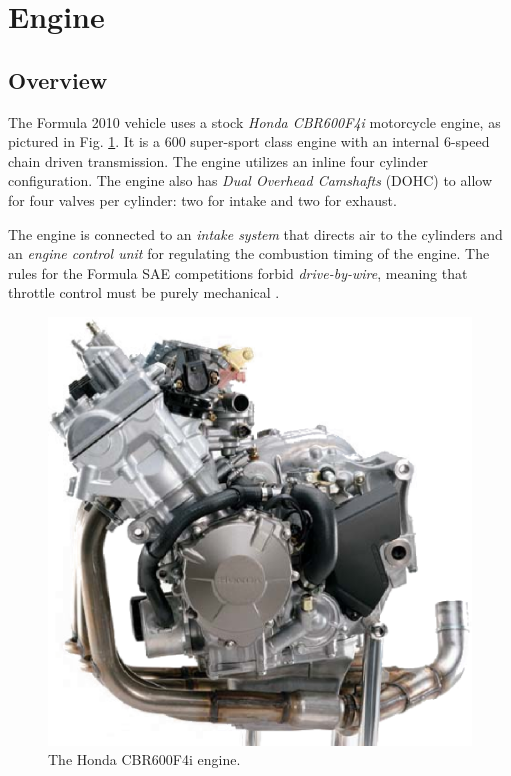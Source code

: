 \section{Engine}

\subsection{Overview}


The Formula 2010 vehicle uses a stock \emph{Honda CBR600F4i} motorcycle engine, as pictured in Fig. \ref{fig:cbr600f4i_engine}. It is a \unit{600}{\centi\cubic\metre} super-sport class engine with an internal 6-speed chain driven transmission. The engine utilizes an inline four cylinder configuration. The engine also has \emph{Dual Overhead Camshafts} (DOHC) to allow for four valves per cylinder: two for intake and two for exhaust.

The engine is connected to an \emph{intake system} that directs air to the cylinders and an \emph{engine control unit} for regulating the combustion timing of the engine. The rules for the Formula SAE competitions forbid \emph{drive-by-wire}, meaning that throttle control must be purely mechanical \cite{2010fsaerules}.

\begin{figure}[H]
	\centering
	 	\includegraphics[scale=0.5]{background/figures/cbr600f4i_engine.eps}
    \caption{The Honda CBR600F4i engine.}
    \label{fig:cbr600f4i_engine}
\end{figure}


